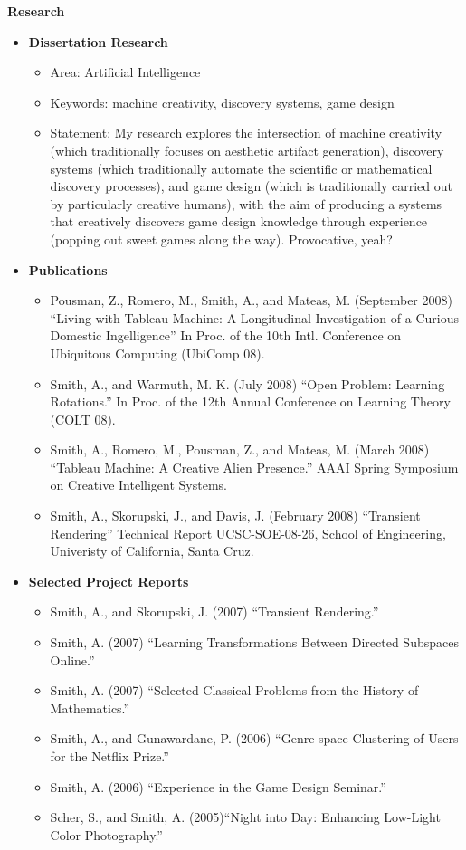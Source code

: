 \documentclass[10pt]{article}
\begin{document}
{\large \textbf{Research}}
\begin{itemize}

\item
    \textbf{Dissertation Research}
    \begin{itemize}
        \item Area: Artificial Intelligence
        \item Keywords: machine creativity, discovery systems, game design
        \item Statement: My research explores the intersection of machine creativity (which traditionally focuses on aesthetic artifact generation), discovery systems (which traditionally automate the scientific or mathematical discovery processes), and game design (which is traditionally carried out by particularly creative humans), with the aim of producing a systems that creatively discovers game design knowledge through experience (popping out sweet games along the way). Provocative, yeah?
    \end{itemize}
 
\item 
    \textbf{Publications}
    \begin{itemize}
        \item Pousman, Z., Romero, M., Smith, A., and Mateas, M. (September 2008) ``Living with Tableau Machine: A Longitudinal Investigation of a Curious Domestic Ingelligence'' In Proc. of the 10th Intl. Conference on Ubiquitous Computing (UbiComp 08).
        \item Smith, A., and Warmuth, M. K. (July 2008) ``Open Problem: Learning Rotations.'' In Proc. of the 12th Annual Conference on Learning Theory (COLT 08).
        \item Smith, A., Romero, M., Pousman, Z., and Mateas, M. (March 2008) ``Tableau Machine: A Creative Alien Presence.'' AAAI Spring Symposium on Creative Intelligent Systems. 
        \item Smith, A., Skorupski, J., and Davis, J. (February 2008) ``Transient Rendering'' Technical Report UCSC-SOE-08-26, School of Engineering, Univeristy of California, Santa Cruz.
  \end{itemize}
  
\item  
  \textbf{Selected Project Reports}
    \begin{itemize}
       \item Smith, A., and Skorupski, J. (2007) ``Transient Rendering.''
       \item Smith, A. (2007) ``Learning Transformations Between Directed Subspaces Online.''
       \item Smith, A. (2007) ``Selected Classical Problems from the History of Mathematics.''
       \item Smith, A., and Gunawardane, P. (2006) ``Genre-space Clustering of Users for the Netflix Prize.''
       \item Smith, A. (2006) ``Experience in the Game Design Seminar.''
       \item Scher, S., and Smith, A. (2005)``Night into Day: Enhancing Low-Light Color Photography.''
  \end{itemize}
    

\end{itemize}
\end{document}

